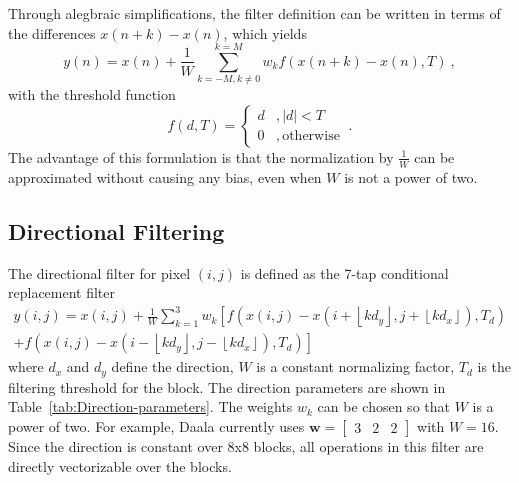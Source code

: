 \documentclass[smallabstract,smallcaptions]{dccpaper}
\begin{document}
Through alegbraic simplifications, the filter definition can be written
in terms of the differences $x\left(n+k\right)-x\left(n\right)$,
which yields
\begin{equation}
y\left(n\right)=x\left(n\right)+\frac{1}{W}\sum_{k=-M,k\neq0}^{k=M}w_{k}f\left(x\left(n+k\right)-x\left(n\right),T\right)\ ,\label{eq:conditional-replacement-diff}
\end{equation}
with the threshold function
\begin{equation}
f\left(d,T\right)=\left\{ \begin{array}{ll}
d & ,\left|d\right|<T\\
0 & ,\mathrm{otherwise}
\end{array}\right.\ .\label{eq:threshold-function}
\end{equation}
The advantage of this formulation is that the normalization by $\frac{1}{W}$
can be approximated without causing any bias, even when $W$ is not
a power of two.

\subsection{Directional Filtering}

The directional filter for pixel $\left(i,j\right)$ is defined as
the 7-tap conditional replacement filter
\begin{gather}
y\left(i,j\right)=x\left(i,j\right)+\frac{1}{W}\sum_{k=1}^{3}w_{k}\left[f\left(x\left(i,j\right)-x\left(i+\left\lfloor kd_{y}\right\rfloor ,j+\left\lfloor kd_{x}\right\rfloor \right),T_{d}\right)\right.\nonumber \\
\left.+f\left(x\left(i,j\right)-x\left(i-\left\lfloor kd_{y}\right\rfloor ,j-\left\lfloor kd_{x}\right\rfloor \right),T_{d}\right)\right]\label{eq:directional_filter}
\end{gather}
where $d_{x}$ and $d_{y}$ define the direction, $W$ is a constant
normalizing factor, $T_{d}$ is the filtering threshold for the block.
The direction parameters are shown in Table~\ref{tab:Direction-parameters}.
The weights $w_{k}$ can be chosen so that $W$ is a power of two.
For example, Daala currently uses $\mathbf{w}=\left[\begin{array}{ccc}
3 & 2 & 2\end{array}\right]$ with $W=16$. Since the direction is constant over 8x8 blocks, all
operations in this filter are directly vectorizable over the blocks.

\begin{table}

\caption{Direction parameters\label{tab:Direction-parameters}}


\end{table}
\end{document}
